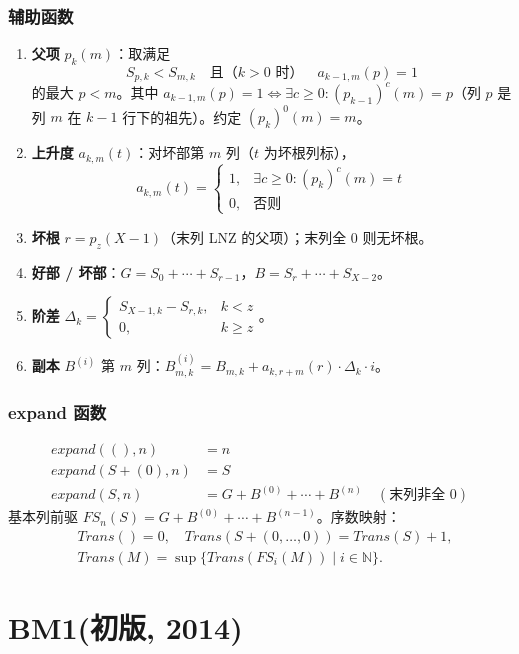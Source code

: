 \documentclass[UTF8]{ctexart}
\begin{document}
\subsubsection{辅助函数}
\begin{enumerate}
  \item \textbf{父项} $p_k(m)$：取满足
  \[
  S_{p,k}<S_{m,k}\quad\text{且（}k>0\text{ 时）}\quad a_{k-1,m}(p)=1
  \]
  的最大 $p<m$。其中 $a_{k-1,m}(p)=1\iff\exists c\ge0:(p_{k-1})^c(m)=p$（列 $p$ 是列 $m$ 在 $k-1$ 行下的祖先）。约定 $(p_k)^0(m)=m$。
  \item \textbf{上升度} $a_{k,m}(t)$：对坏部第 $m$ 列（$t$ 为坏根列标），
  \[
  a_{k,m}(t)=\begin{cases}1,& \exists c\ge0:(p_k)^c(m)=t\\0,& \text{否则}\end{cases}
  \]
  \item \textbf{坏根} $r=p_z(X-1)$（末列 LNZ 的父项）；末列全 $0$ 则无坏根。
  \item \textbf{好部 / 坏部}：$G=S_0+\cdots+S_{r-1}$，$B=S_r+\cdots+S_{X-2}$。
  \item \textbf{阶差} $\Delta_k=\begin{cases}S_{X-1,k}-S_{r,k},& k<z\\0,& k\ge z\end{cases}$。
  \item \textbf{副本} $B^{(i)}$ 第 $m$ 列：$B^{(i)}_{m,k}=B_{m,k}+a_{k,r+m}(r)\cdot\Delta_k\cdot i$。
\end{enumerate}

\subsubsection{expand 函数}
\begin{align*}
\mathit{expand}((),n)&=n\\
\mathit{expand}(S+(0),n)&=S\\
\mathit{expand}(S,n)&=G+B^{(0)}+\cdots+B^{(n)}\quad(\text{末列非全 }0)
\end{align*}
基本列前驱 $FS_n(S)=G+B^{(0)}+\cdots+B^{(n-1)}$。序数映射：
\[
\begin{aligned}
&\mathit{Trans}()=0,\quad\mathit{Trans}(S+(0,\dots,0))=\mathit{Trans}(S)+1,\\
&\mathit{Trans}(M)=\sup\{\mathit{Trans}(FS_i(M))\mid i\in\mathbb N\}.
\end{aligned}
\]

\section{BM1(初版, 2014)}
\end{document}
